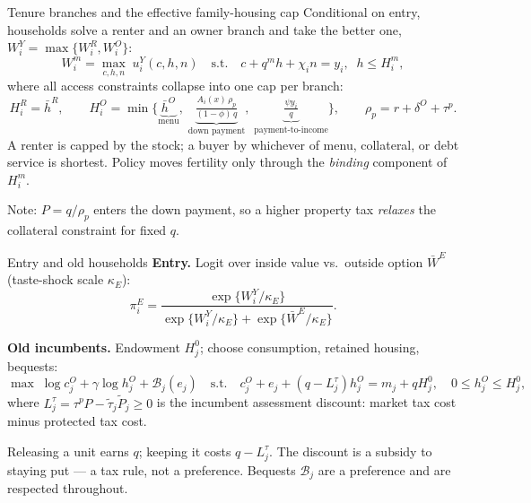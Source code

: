 \documentclass[11pt,aspectratio=169]{beamer}
\newcommand{\1}{\mathbf 1}
\begin{document}
\begin{frame}{Tenure branches and the effective family-housing cap}
\small
Conditional on entry, households solve a renter and an owner branch and take the better one, $W_i^Y=\max\{W_i^R,W_i^O\}$:
\[
W_i^m=\max_{c,h,n}\;u_i^Y(c,h,n)
\quad\text{s.t.}\quad
c+q^m h+\chi_i n=y_i,\;\; h\le H_i^m,
\]
where all access constraints collapse into one cap per branch:
\[
H_i^R=\bar h^R,
\qquad
H_i^O=\min\Big\{
\underbrace{\bar h^O}_{\text{menu}},\;
\underbrace{\tfrac{A_i(x)\,\rho_p}{(1-\phi)\,q}}_{\text{down payment}},\;
\underbrace{\tfrac{\psi y_i}{q}}_{\text{payment-to-income}}
\Big\},
\qquad
\rho_p=r+\delta^O+\tau^p .
\]
\smallskip
A renter is capped by the stock; a buyer by whichever of menu, collateral, or debt service is shortest. Policy moves fertility only through the \emph{binding} component of $H_i^m$.

\smallskip
\footnotesize Note: $P=q/\rho_p$ enters the down payment, so a higher property tax \emph{relaxes} the collateral constraint for fixed $q$.
\end{frame}

\begin{frame}{Entry and old households}
\small
\textbf{Entry.} Logit over inside value vs.\ outside option $\bar W^E$ (taste-shock scale $\kappa_E$):
\[
\pi_i^E=\frac{\exp\{W_i^Y/\kappa_E\}}{\exp\{W_i^Y/\kappa_E\}+\exp\{\bar W^E/\kappa_E\}} .
\]

\medskip
\textbf{Old incumbents.} Endowment $H_j^0$; choose consumption, retained housing, bequests:
\[
\max\;\log c_j^O+\gamma\log h_j^O+\mathcal B_j(e_j)
\quad\text{s.t.}\quad
c_j^O+e_j+(q-L_j^\tau)h_j^O=m_j+qH_j^0,
\quad 0\le h_j^O\le H_j^0,
\]
where $L_j^\tau=\tau^pP-\tilde\tau_j\tilde P_j\ge0$ is the incumbent assessment discount: market tax cost minus protected tax cost.

\medskip
Releasing a unit earns $q$; keeping it costs $q-L_j^\tau$. The discount is a \alert{subsidy to staying put} --- a tax rule, not a preference. Bequests $\mathcal B_j$ are a preference and are respected throughout.
\end{frame}
\end{document}
